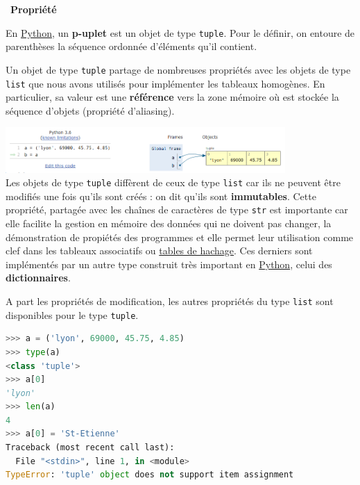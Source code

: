 \documentclass[
  11pt,
]{article}
\newcommand{\passthrough}[1]{#1}
\newcounter{prop}
\newenvironment{propriete}[1]
{\par \medskip   \addtocounter{prop}{1} \noindent  
\begin{bclogo}[arrondi =0.1,  ombre = true, barre=none, logo=\bcbook, marge=4]{~\textbf{Propriété} \textbf{\theprop} {\itshape #1} }   \par}
{
\end{bclogo}
 \par \bigskip }
\newcounter{prog}
\begin{document}
\begin{propriete}{}

En
\href{https://docs.python.org/3/tutorial/datastructures.html}{Python},
un \textbf{p-uplet} est un objet de type
\passthrough{\lstinline!tuple!}. Pour le définir, on entoure de
parenthèses la séquence ordonnée d'éléments qu'il contient.

Un objet de type \passthrough{\lstinline!tuple!} partage de nombreuses
propriétés avec les objets de type \passthrough{\lstinline!list!} que
nous avons utilisés pour implémenter les tableaux homogènes. En
particulier, sa valeur est une \textbf{référence} vers la zone mémoire
où est stockée la séquence d'objets (propriété d'aliasing).

\includegraphics[width=0.8\textwidth,height=\textheight]{images/aliasing.png}\\

Les objets de type \passthrough{\lstinline!tuple!} diffèrent de ceux de
type \passthrough{\lstinline!list!} car ils ne peuvent être modifiés une
fois qu'ils sont créés : on dit qu'ils sont \textbf{immutables}. Cette
propriété, partagée avec les chaînes de caractères de type
\passthrough{\lstinline!str!} est importante car elle facilite la
gestion en mémoire des données qui ne doivent pas changer, la
démonstration de propiétés des programmes et elle permet leur
utilisation comme clef dans les tableaux associatifs ou
\href{https://fr.wikipedia.org/wiki/Table_de_hachage}{tables de
hachage}. Ces derniers sont implémentés par un autre type construit très
important en
\href{https://docs.python.org/3/tutorial/datastructures.html}{Python},
celui des \textbf{dictionnaires}.

A part les propriétés de modification, les autres propriétés du type
\passthrough{\lstinline!list!} sont disponibles pour le type
\passthrough{\lstinline!tuple!}.

\begin{lstlisting}[language=Python]
>>> a = ('lyon', 69000, 45.75, 4.85)
>>> type(a)
<class 'tuple'>
>>> a[0]
'lyon'
>>> len(a)
4
>>> a[0] = 'St-Etienne'
Traceback (most recent call last):
  File "<stdin>", line 1, in <module>
TypeError: 'tuple' object does not support item assignment
\end{lstlisting}

\end{propriete}
\end{document}
